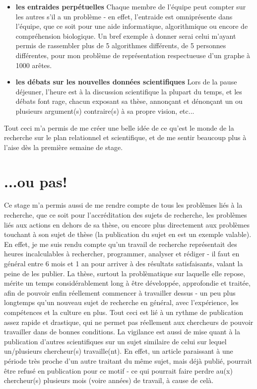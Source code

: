 \documentclass[12pt]{report}
\begin{document}
\begin{spacing}{1.2}
\begin{itemize}
\item \textbf{les entraides perpétuelles}
	\newline
	Chaque membre de l'équipe peut compter sur les autres s'il a un problème - en effet, l'entraide est omniprésente dans l'équipe, que ce soit pour une aide informatique, algorithmique ou encore de compréhension biologique. Un bref exemple à donner serai celui m'ayant permis de rassembler plus de 5 algorithmes différents, de 5 personnes différentes, pour mon problème de représentation respectueuse d'un graphe à 1000 arêtes.
\item \textbf{les débats sur les nouvelles données scientifiques}
	\newline
	Lors de la pause déjeuner, l'heure est à la discussion scientifique la plupart du temps, et les débats font rage, chacun exposant sa thèse, annonçant et dénonçant un ou plusieurs argument(s) contraire(s) à sa propre vision, etc...
\end{itemize}
Tout ceci m'a permis de me créer une belle idée de ce qu'est le monde de la recherche sur le plan relationnel et scientifique, et de me sentir beaucoup plus à l'aise dès la première semaine de stage.

\section{...ou pas!}

Ce stage m'a permis aussi de me rendre compte de tous les problèmes liés à la recherche, que ce soit pour l'accréditation des sujets de recherche, les problèmes liés aux actions en dehors de sa thèse, ou encore plus directement aux problèmes touchant à son sujet de thèse (la publication du sujet en est un exemple valable).
\newline
En effet, je me suis rendu compte qu'un travail de recherche représentait des heures incalculables à rechercher, programmer, analyser et rédiger - il faut en général entre 6 mois et 1 an pour arriver à des résultats satisfaisants, valant la peine de les publier.
\newline
La thèse, surtout la problèmatique sur laquelle elle repose, mérite un temps considérablement long à être développée, approfondie et traitée, afin de pouvoir enfin réellement commencer à travailler dessus - un peu plus longtemps qu'un nouveau sujet de recherche en général, avec l'expérience, les compétences et la culture en plus.
\newline
Tout ceci est lié à un rythme de publication assez rapide et drastique, qui ne permet pas réellement aux chercheurs de pouvoir travailler dans de bonnes conditions.
\newline
La vigilance est aussi de mise quant à la publication d'autres scientifiques sur un sujet similaire de celui sur lequel un/plusieurs chercheur(s) travaille(nt). En effet, un article paraissant à une période très proche d'un autre traitant du même sujet, mais déjà publié, pourrait être refusé en publication pour ce motif - ce qui pourrait faire perdre au(x) chercheur(s) plusieurs mois (voire années) de travail, à cause de celà.


\end{spacing}
\end{document}
